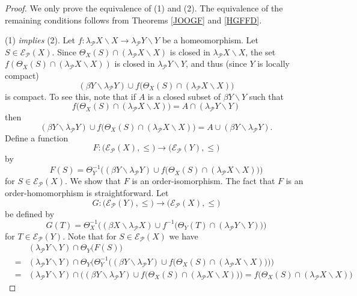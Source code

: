\documentclass{amsart}
\theoremstyle{definition}
\theoremstyle{remark}
\theoremstyle{notation}
\numberwithin{equation}{section}
\begin{document}
\begin{proof}
We only prove the equivalence of (1) and (2). The equivalence of the remaining conditions follows from Theorems \ref{JOOGF} and \ref{HGFFD}.

(1) {\em  implies} (2).  Let $f:\lambda_{{\mathcal P}} X\backslash X\rightarrow\lambda_{{\mathcal P}} Y\backslash Y$ be a
homeomorphism. Let $S\in {\mathscr E}_{{\mathcal P}}(X)$. Since $\Theta_X(S)\cap(\lambda_{{\mathcal P}} X\backslash X)$ is closed in
$\lambda_{{\mathcal P}} X\backslash X$, the set $f(\Theta_X(S)\cap(\lambda_{{\mathcal P}} X\backslash X))$ is closed in  $\lambda_{{\mathcal P}} Y\backslash Y$, and thus (since $Y$ is locally compact)
\[(\beta Y\backslash\lambda_{{\mathcal P}} Y)\cup f\big(\Theta_X(S)\cap(\lambda_{{\mathcal P}} X\backslash X)\big)\]
is compact. To see this, note that if $A$ is a closed subset of $\beta Y\backslash Y$ such that
\[f\big(\Theta_X(S)\cap(\lambda_{{\mathcal P}} X\backslash X)\big)=A\cap(\lambda_{{\mathcal P}} Y\backslash Y)\]
then
\[(\beta Y\backslash\lambda_{{\mathcal P}} Y)\cup f\big(\Theta_X(S)\cap(\lambda_{{\mathcal P}} X\backslash X)\big)=A\cup(\beta Y\backslash\lambda_{{\mathcal P}} Y).\]
Define a function
\[F:\big({\mathscr E}_{{\mathcal P}}(X),\leq\big)\rightarrow\big({\mathscr E}_{{\mathcal P}}(Y),\leq\big)\]
by
\[F(S)=\Theta_Y^{-1}\big((\beta Y\backslash\lambda_{{\mathcal P}} Y)\cup f\big(\Theta_X(S)\cap(\lambda_{{\mathcal P}} X\backslash X)\big)\big)\]
for $S\in  {\mathscr E}_{{\mathcal P}}(X)$. We show that $F$ is an  order-isomorphism. The fact that $F$ is  an order-homomorphism is straightforward.
Let
\[G:\big({\mathscr E}_{{\mathcal P}}(Y),\leq\big)\rightarrow\big({\mathscr E}_{{\mathcal P}}(X),\leq\big)\]
be defined by
\[G(T)=\Theta_X^{-1}\big((\beta X\backslash\lambda_{{\mathcal P}} X)\cup f^{-1}\big(\Theta_Y(T)\cap(\lambda_{{\mathcal P}} Y\backslash Y)\big)\big)\]
for $T\in  {\mathscr E}_{{\mathcal P}}(Y)$. Note that for $S\in  {\mathscr E}_{{\mathcal P}}(X)$ we have
\begin{eqnarray*}
&&(\lambda_{{\mathcal P}} Y\backslash Y)\cap\Theta_Y\big(F(S)\big)\\&=&(\lambda_{{\mathcal P}} Y\backslash Y)\cap\Theta_Y\big(\Theta_Y^{-1}\big((\beta Y\backslash\lambda_{{\mathcal P}} Y)\cup f\big(\Theta_X(S)\cap(\lambda_{{\mathcal P}} X\backslash X)\big)\big)\big)\\&=&(\lambda_{{\mathcal P}} Y\backslash Y)\cap\big((\beta Y\backslash\lambda_{{\mathcal P}} Y)\cup f\big(\Theta_X(S)\cap(\lambda_{{\mathcal P}} X\backslash X)\big)\big)=f\big(\Theta_X(S)\cap(\lambda_{{\mathcal P}} X\backslash X)\big)

\end{eqnarray*}
\end{proof}
\end{document}
